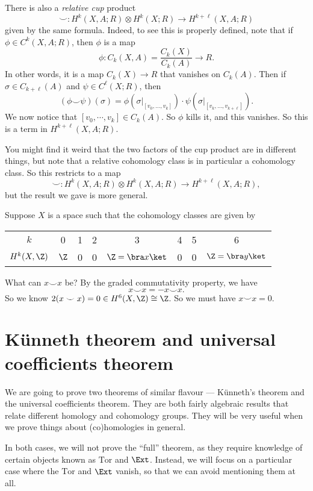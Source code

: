\documentclass[a4paper]{article}
\theoremstyle{definition}
\begin{document}
There is also a \emph{relative cup} product
\[
  \smile: H^k(X, A; R) \otimes H^k(X; R) \to H^{k + \ell}(X, A; R)
\]
given by the same formula. Indeed, to see this is properly defined, note that if $\phi \in C^k(X, A; R)$, then $\phi$ is a map
\[
  \phi:C_k(X, A) = \frac{C_k(X)}{C_k(A)} \to R.
\]
In other words, it is a map $C_k(X) \to R$ that vanishes on $C_k(A)$. Then if $\sigma \in C_{k + \ell}(A)$ and $\psi \in C^\ell(X; R)$, then
\[
  (\phi \smile \psi)(\sigma) = \phi(\sigma|_{[v_0, \ldots, v_k]}) \cdot \psi(\sigma|_{[v_k, \ldots, v_{k + \ell}]}).
\]
We now notice that $[v_0, \cdots, v_k] \in C_k(A)$. So $\phi$ kills it, and this vanishes. So this is a term in $H^{k + \ell}(X, A; R)$.

You might find it weird that the two factors of the cup product are in different things, but note that a relative cohomology class is in particular a cohomology class. So this restricts to a map
\[
  \smile: H^k(X, A; R) \otimes H^k(X, A; R) \to H^{k + \ell}(X, A; R),
\]
but the result we gave is more general.

\begin{eg}
  Suppose $X$ is a space such that the cohomology classes are given by
  \begin{center}
    \begin{tabular}{cccccccc}
      $k$ & 0 & 1 & 2 & 3 & 4 & 5 & 6\\
      $H^k(X, \Z)$ & $\Z$ & 0 & 0 & $\Z = \bra x\ket$ & 0 & 0 & $\Z = \bra y\ket$
    \end{tabular}
  \end{center}
  What can $x \smile x$ be? By the graded commutativity property, we have
  \[
    x\smile x = - x \smile x.
  \]
  So we know $2(x \smile x) = 0 \in H^6(X, \Z) \cong \Z$. So we must have $x \smile x = 0$.
\end{eg}

\section{\texorpdfstring{K\"unneth}{Kunneth} theorem and universal coefficients theorem}
We are going to prove two theorems of similar flavour --- K\"unneth's theorem and the universal coefficients theorem. They are both fairly algebraic results that relate different homology and cohomology groups. They will be very useful when we prove things about (co)homologies in general.

In both cases, we will not prove the ``full'' theorem, as they require knowledge of certain objects known as $\mathrm{Tor}$ and $\Ext$. Instead, we will focus on a particular case where the $\mathrm{Tor}$ and $\Ext$ vanish, so that we can avoid mentioning them at all.
\end{document}
